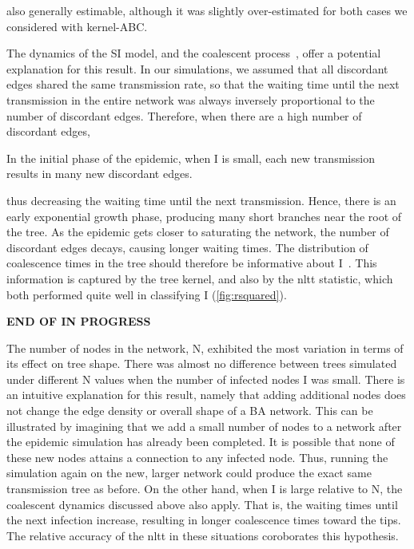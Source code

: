 also generally estimable, although it was slightly over-estimated for both
cases we considered with kernel-\gls{ABC}. 

The dynamics of the \gls{SI} model,
and the coalescent process~\autocite{kingman1982coalescent}, offer a potential
explanation for this result. In our simulations, we assumed that all discordant
edges shared the same transmission rate, so that the waiting time until the
next transmission in the entire network was always inversely proportional to
the number of discordant edges. Therefore, when there are a high number of
discordant edges, 

In the initial phase of the epidemic, when \gls{I}
is small, each new transmission results in many new discordant edges. 

thus
decreasing the waiting time until the next transmission. Hence,
there is an early exponential growth phase, producing many short branches near
the root of the tree. As the epidemic gets closer to saturating the network,
the number of discordant edges decays, causing longer waiting times. The
distribution of coalescence times in the tree should therefore be informative
about \gls{I}~\autocite{volz2009phylodynamics}. This information is captured by
the tree kernel, and also by the \gls{nltt} statistic, which both performed
quite well in classifying \gls{I} (\cref{fig:rsquared}). 

\textbf{END OF IN PROGRESS}

The number of nodes in the network, \gls{N}, exhibited the most variation in
terms of its effect on tree shape. There was almost no difference between trees
simulated under different \gls{N} values when the number of infected nodes
\gls{I} was small. There is an intuitive explanation for this result, namely
that adding additional nodes does not change the edge density or overall shape
of a \gls{BA} network. This can be illustrated by imagining that we add a small
number of nodes to a network after the epidemic simulation has already been
completed. It is possible that none of these new nodes attains a connection to
any infected node. Thus, running the simulation again on the new, larger
network could produce the exact same transmission tree as before. On the other
hand, when \gls{I} is large relative to \gls{N}, the coalescent dynamics
discussed above also apply. That is, the waiting times until the next infection
increase, resulting in longer coalescence times toward the tips. The relative
accuracy of the \gls{nltt} in these situations coroborates this hypothesis.

